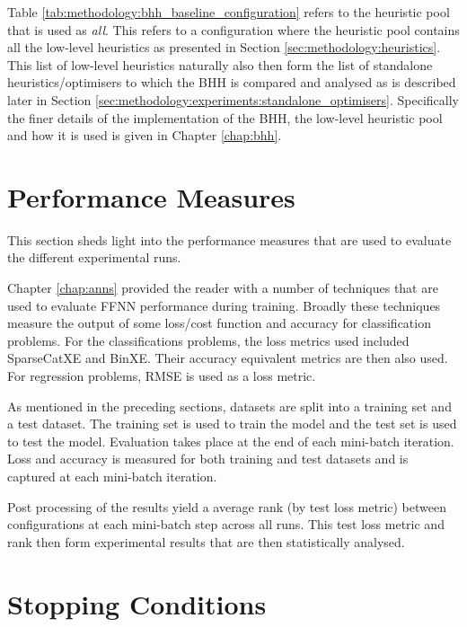 Table \ref{tab:methodology:bhh_baseline_configuration} refers to the heuristic pool that is used as \textit{all}. This refers to a configuration where the heuristic pool contains all the low-level heuristics as presented in Section \ref{sec:methodology:heuristics}. This list of low-level heuristics naturally also then form the list of standalone heuristics/optimisers to which the \ac{BHH} is compared and analysed as is described later in  Section \ref{sec:methodology:experiments:standalone_optimisers}. Specifically the finer details of the implementation of the \ac{BHH}, the low-level heuristic pool and how it is used is given in Chapter \ref{chap:bhh}.


\section{Performance Measures}
\label{sec:methodology:performance_measures}

This section sheds light into the performance measures that are used to evaluate the different experimental runs.

Chapter \ref{chap:anns} provided the reader with a number of techniques that are used to evaluate \ac{FFNN} performance during training. Broadly these techniques measure the output of some loss/cost function and accuracy for classification problems. For the classifications problems, the loss metrics used included \ac{SparseCatXE} and \ac{BinXE}. Their accuracy equivalent metrics are then also used. For regression problems, \ac{RMSE} is used as a loss metric.

As mentioned in the preceding sections, datasets are split into a training set and a test dataset. The training set is used to train the model and the test set is used to test the model. Evaluation takes place at the end of each mini-batch iteration. Loss and accuracy is measured for both training and test datasets and is captured at each mini-batch iteration.

Post processing of the results yield a average rank (by test loss metric) between configurations at each mini-batch step across all runs. This test loss metric and rank then form experimental results that are then statistically analysed.

\section{Stopping Conditions}
\label{sec:methodology:stopping_conditions}

